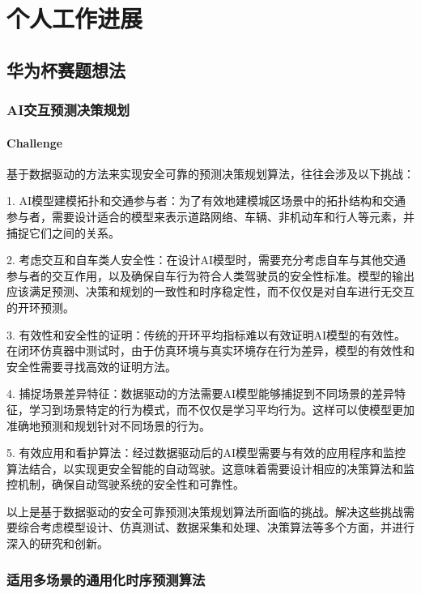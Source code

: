 \documentclass[letterpaper,12pt]{article}
\begin{document}
	\section{个人工作进展}
		
		\subsection{华为杯赛题想法}
					
			\subsubsection{AI交互预测决策规划}
			
				\paragraph{Challenge}
				基于数据驱动的方法来实现安全可靠的预测决策规划算法，往往会涉及以下挑战：
			
				1. AI模型建模拓扑和交通参与者：为了有效地建模城区场景中的拓扑结构和交通参与者，需要设计适合的模型来表示道路网络、车辆、非机动车和行人等元素，并捕捉它们之间的关系。
				
				2. 考虑交互和自车类人安全性：在设计AI模型时，需要充分考虑自车与其他交通参与者的交互作用，以及确保自车行为符合人类驾驶员的安全性标准。模型的输出应该满足预测、决策和规划的一致性和时序稳定性，而不仅仅是对自车进行无交互的开环预测。
				
				3. 有效性和安全性的证明：传统的开环平均指标难以有效证明AI模型的有效性。在闭环仿真器中测试时，由于仿真环境与真实环境存在行为差异，模型的有效性和安全性需要寻找高效的证明方法。
				
				4. 捕捉场景差异特征：数据驱动的方法需要AI模型能够捕捉到不同场景的差异特征，学习到场景特定的行为模式，而不仅仅是学习平均行为。这样可以使模型更加准确地预测和规划针对不同场景的行为。
				
				5. 有效应用和看护算法：经过数据驱动后的AI模型需要与有效的应用程序和监控算法结合，以实现更安全智能的自动驾驶。这意味着需要设计相应的决策算法和监控机制，确保自动驾驶系统的安全性和可靠性。
				
				以上是基于数据驱动的安全可靠预测决策规划算法所面临的挑战。解决这些挑战需要综合考虑模型设计、仿真测试、数据采集和处理、决策算法等多个方面，并进行深入的研究和创新。
			
			\subsubsection{适用多场景的通用化时序预测算法}
			
\end{document}
